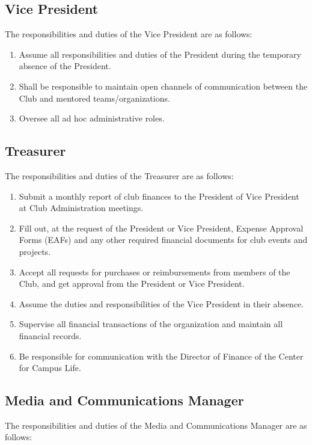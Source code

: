 \documentclass[english,11pt]{article}
\begin{document}
\subsection{Vice President} \label{sect:cadmin:vicepresident}
The responsibilities and duties of the Vice President are as follows:

\begin{enumerate}[label=\Alph*.]	
    \item Assume all responsibilities and duties of the President during the temporary absence of the President.
    \item Shall be responsible to maintain open channels of communication between the Club and mentored teams/organizations.
    \item Oversee all ad hoc administrative roles.
\end{enumerate}

\subsection{Treasurer} \label{sect:cadmin:treasurer}
The responsibilities and duties of the Treasurer are as follows:

\begin{enumerate}[label=\Alph*.]
    \item Submit a monthly report of club finances to the President of Vice President at Club Administration meetings.
    \item Fill out, at the request of the President or Vice President, Expense Approval Forms (EAFs) and any other required financial documents for club events and projects.
    \item Accept all requests for purchases or reimbursements from members of the Club, and get approval from the President or Vice President.
    \item Assume the duties and responsibilities of the Vice President in their absence.
    \item Supervise all financial transactions of the organization and maintain all financial records.
    \item Be responsible for communication with the Director of Finance of the Center for Campus Life.
\end{enumerate}

\subsection{Media and Communications Manager} \label{sect:cadmin:mediacomms}
The responsibilities and duties of the Media and Communications Manager are as follows:
\end{document}
